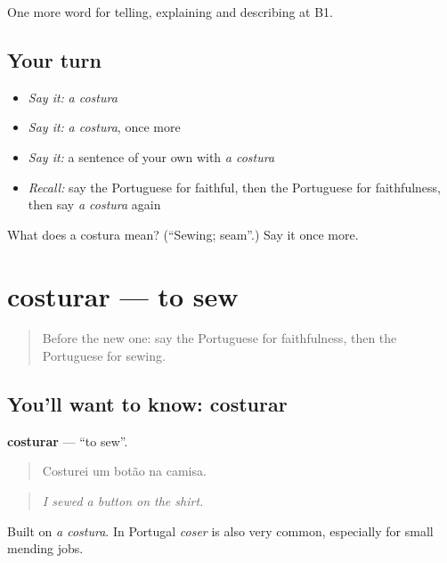 \begin{grammarlens}[title={What you've built}]
One more word for telling, explaining and describing at B1.
\end{grammarlens}

\subsection*{Your turn}
\begin{itemize}
\raggedright
  \item \emph{Say it:} \emph{a costura}
  \item \emph{Say it:} \emph{a costura}, once more
  \item \emph{Say it:} a sentence of your own with \emph{a costura}
  \item \emph{Recall:} say the Portuguese for faithful, then the Portuguese for faithfulness, then say \emph{a costura} again
\end{itemize}

\begin{tcolorbox}[breakable,colback=teal!4,colframe=teal!35!black,title={Before you move on}]
What does a costura mean? (\textquotedblleft{}Sewing; seam\textquotedblright{}.) Say it once more.
\end{tcolorbox}
\section[costurar]{costurar — to sew}

\label{lesson:PT-C500-costurar}



\begin{quote}
Before the new one: say the Portuguese for faithfulness, then the Portuguese for sewing.
\end{quote}

\subsection*{You'll want to know: costurar}
\textbf{costurar} — \textquotedblleft{}to sew\textquotedblright{}.

\begin{quote}
Costurei um botão na camisa.
\end{quote}

\begin{quote}
\emph{I sewed a button on the shirt.}
\end{quote}

Built on \emph{a costura}. In Portugal \emph{coser} is also very common, especially for small mending jobs.

